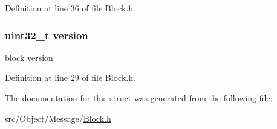 Definition at line 36 of file Block.h.

\hypertarget{struct_block_acd99bb05ca015e7d74448acb1deba7ca}{
\subsubsection[{version}]{\setlength{\rightskip}{0pt plus 5cm}uint32\_\-t {\bf version}}}
\label{struct_block_acd99bb05ca015e7d74448acb1deba7ca}
block version 

Definition at line 29 of file Block.h.



The documentation for this struct was generated from the following file:\begin{DoxyCompactItemize}
\item 
src/Object/Message/\hyperlink{_block_8h}{Block.h}\end{DoxyCompactItemize}
